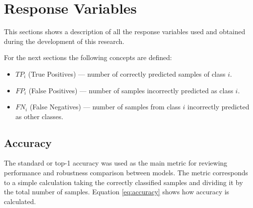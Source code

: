 


\section{Response Variables}
\label{sec:response_variables}
This sections shows a description of all the response variables used and obtained during the development of this research.

For the next sections the following concepts are defined: 

\begin{itemize}
    \item $TP_i$ (True Positives) — number of correctly predicted samples of class $i$.
    \item $FP_i$ (False Positives) — number of samples incorrectly predicted as class $i$.
    \item $FN_i$ (False Negatives) — number of samples from class $i$ incorrectly predicted as other classes.
\end{itemize}

\subsection{Accuracy} 
\label{sub:accuracy}


The standard or top-1 accuracy was used as the main metric for reviewing performance and robustness comparison between models. The metric corresponds to a simple calculation taking the correctly classified samples and dividing it by the total number of samples. Equation \ref{eq:accuracy} shows how accuracy is calculated. 

